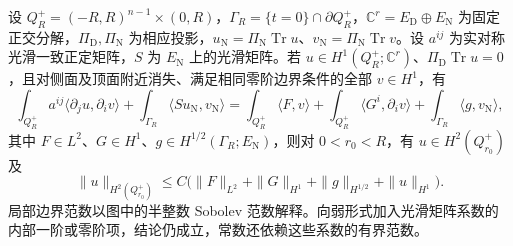 \begin{lemma}\label{g3:lem:mixed-bundle-local-regularity}
	设 \(Q_R^+=(-R,R)^{n-1}\times(0,R)\)，\(\Gamma_R=\{t=0\}\cap\partial Q_R^+\)，\(\mathbb C^r=E_{\mathrm D}\oplus E_{\mathrm N}\) 为固定正交分解，\(\Pi_{\mathrm D},\Pi_{\mathrm N}\) 为相应投影，\(u_{\mathrm N}=\Pi_{\mathrm N}\operatorname{Tr}u\)、\(v_{\mathrm N}=\Pi_{\mathrm N}\operatorname{Tr}v\)。设 \(a^{ij}\) 为实对称光滑一致正定矩阵，\(S\) 为 \(E_{\mathrm N}\) 上的光滑矩阵。若 \(u\in H^1(Q_R^+;\mathbb C^r)\)、\(\Pi_{\mathrm D}\operatorname{Tr}u=0\)，且对侧面及顶面附近消失、满足相同零阶边界条件的全部 \(v\in H^1\)，有
	\begin{equation}\label{g3:eq:mixed-flat-weak-equation}
		\int_{Q_R^+}a^{ij}\langle\partial_j u,\partial_i v\rangle
		+\int_{\Gamma_R}\langle Su_{\mathrm N},v_{\mathrm N}\rangle
		=\int_{Q_R^+}\langle F,v\rangle
		+\int_{Q_R^+}\langle G^i,\partial_i v\rangle
		+\int_{\Gamma_R}\langle g,v_{\mathrm N}\rangle,
	\end{equation}
	其中 \(F\in L^2\)、\(G\in H^1\)、\(g\in H^{1/2}(\Gamma_R;E_{\mathrm N})\)，则对 \(0<r_0<R\)，有 \(u\in H^2(Q_{r_0}^+)\) 及
	\begin{equation}\label{g3:eq:mixed-flat-h2-estimate}
		\|u\|_{H^2(Q_{r_0}^+)}
		\le C\bigl(\|F\|_{L^2}+\|G\|_{H^1}
		+\|g\|_{H^{1/2}}+\|u\|_{H^1}\bigr).
	\end{equation}
	局部边界范数以图中的半整数 Sobolev 范数解释。向弱形式加入光滑矩阵系数的内部一阶或零阶项，结论仍成立，常数还依赖这些系数的有界范数。
\end{lemma}
